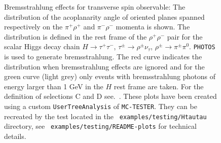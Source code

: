 \documentclass[]{Photos_interface_design}
\begin{document}
\begin{figure}[h!]
\centering
{}
\caption{Bremsstrahlung effects for transverse spin observable: 
  The distribution of the acoplanarity angle of oriented planes spanned respectively on 
  the $\pi^+\rho^+$ and $\pi^-\rho^-$ momenta is shown.  
The distribution is defined in the rest frame of the
  $\rho^+ \rho^-$ pair for the scalar Higgs decay chain $H\to
  \tau^+\tau^-$, $\tau^\pm \to \rho^\pm \nu_\tau$, $\rho^\pm \to
  \pi^\pm \pi^0$. {\tt PHOTOS} is used to generate
  bremsstrahlung.  The red curve indicates the distribution when
  bremsstrahlung effects are ignored and for the green curve (light grey) 
only events
  with bremsstrahlung  photons of energy larger than 1 GeV
  in the $H$ rest frame are taken. For the definition of selections C
  and D see.~\cite{Bower:2002zx,Desch:2003rw}.  These plots have been created using
  a custom {\tt UserTreeAnalysis} of {\tt MC-TESTER}.  They can be
  recreated by  the test located in the {\tt
    examples/testing/Htautau} directory, see {\tt
    examples/testing/README-plots} for technical details.
\label{fig:acoplanarity}
}
\end{figure}
\end{document}
